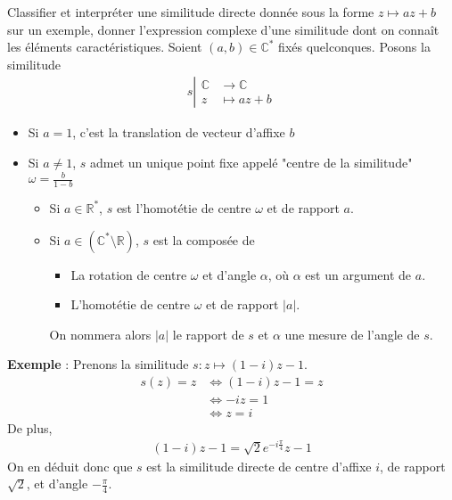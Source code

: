 \documentclass{article}
\renewenvironment{question_kholle}[2][ ]
{
	\subsection{\texorpdfstring{#2}{}}
	\notblank{#1}
	{
		\noindent #1
		\bigbreak
	}
	{}
	\begin{proof}
}
{
	\end{proof}
}
\begin{document}
\begin{question_kholle}{Classifier et interpréter une similitude directe donnée sous la forme $z \mapsto a z + b$ sur un exemple, donner l'expression complexe d'une similitude dont on connaît les éléments caractéristiques.}
	Soient $(a, b) \in \mathbb{C}^*$ fixés quelconques. Posons la similitude
	\begin{align*}
		s \left| \begin{array}{ll}
			         \mathbb{C} & \to \mathbb{C}  \\
			         z          & \mapsto a z + b
		         \end{array}\right.
	\end{align*}
	\begin{itemize}[label=$\lozenge$]
		\item Si $a = 1$, c'est la translation de vecteur d'affixe $b$
		\item Si $a \neq 1$, $s$ admet un unique point fixe appelé "centre de la similitude" $\omega = \frac{b}{1-b}$
		      \begin{itemize}[label=$\star$]
			      \item Si $a \in \mathbb{R}^*$, $s$ est l'homotétie de centre $\omega$ et de rapport $a$.
			      \item Si $a \in (\mathbb{C}^* \setminus \mathbb{R})$, $s$ est la composée de
			            \begin{itemize}
				            \item La rotation de centre $\omega$ et d'angle $\alpha$, où $\alpha$ est un argument de $a$.
				            \item L'homotétie de centre $\omega$ et de rapport $|a|$.
			            \end{itemize}
			            On nommera alors $|a|$ le rapport de $s$ et $\alpha$ une mesure de l'angle de $s$.
		      \end{itemize}
	\end{itemize}
	\textbf{Exemple} : Prenons la similitude $s: z \mapsto (1 - i) z - 1$.
	\begin{align*}
		s(z) = z & \iff (1 - i)z - 1 = z \\
		         & \iff -iz = 1          \\
		         & \iff z = i
	\end{align*}
	De plus,
	\begin{align*}
		(1 - i)z - 1 = \sqrt{2}e^{-i \frac{\pi}{4}}z - 1
	\end{align*}
	On en déduit donc que $s$ est la similitude directe de centre d'affixe $i$, de rapport $\sqrt{2}$, et d'angle $-\frac{\pi}{4}$.
\end{question_kholle}
\end{document}
